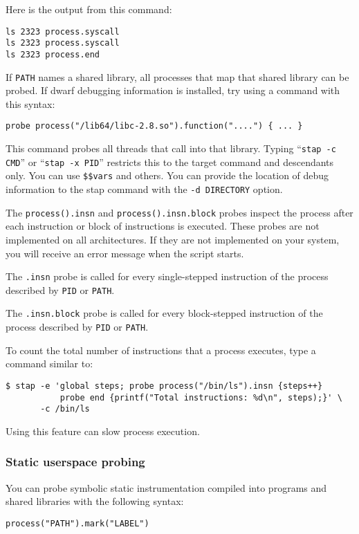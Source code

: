 \documentclass[twoside,english]{article}
\newenvironment{vindent}
{\begin{list}{}{\setlength{\listparindent}{6pt}}
\item[]}
{\end{list}}
\begin{document}
Here is the output from this command:
\begin{vindent}
\begin{verbatim}
ls 2323 process.syscall
ls 2323 process.syscall
ls 2323 process.end
\end{verbatim}
\end{vindent}

If \texttt{PATH} names a shared library, all processes that map that
shared library can be probed.  If dwarf debugging information is
installed, try using a command with this syntax:
\begin{vindent}
\begin{verbatim}
probe process("/lib64/libc-2.8.so").function("....") { ... }
\end{verbatim}
\end{vindent}
This command probes all threads that call into that library.  Typing
``\texttt{stap -c CMD}'' or ``\texttt{stap -x PID}'' restricts this to
the target command and descendants only.  You can use
\texttt{\$\$vars} and others. You can provide the location of debug
information to the stap command with the \texttt{-d DIRECTORY} option.

The \texttt{process().insn} and \texttt{process().insn.block} probes
inspect the process after each instruction or block of instructions is
executed. These probes are not implemented on all architectures. If
they are not implemented on your system, you will receive an error
message when the script starts.

The \texttt{.insn} probe is called for every single-stepped
instruction of the process described by \texttt{PID} or \texttt{PATH}.

The \texttt{.insn.block} probe is called for every block-stepped
instruction of the process described by \texttt{PID} or \texttt{PATH}.

To count the total number of instructions that a process executes,
type a command similar to:
\begin{vindent}
\begin{verbatim}
$ stap -e 'global steps; probe process("/bin/ls").insn {steps++}
           probe end {printf("Total instructions: %d\n", steps);}' \
       -c /bin/ls
\end{verbatim}
\end{vindent}

Using this feature can slow process execution.


\subsubsection{Static userspace probing}
\label{staticuserspace}
You can probe symbolic static instrumentation compiled into programs
and shared libraries with the following syntax:
\begin{vindent}
\begin{verbatim}
process("PATH").mark("LABEL")
\end{verbatim}
\end{vindent}
\end{document}
